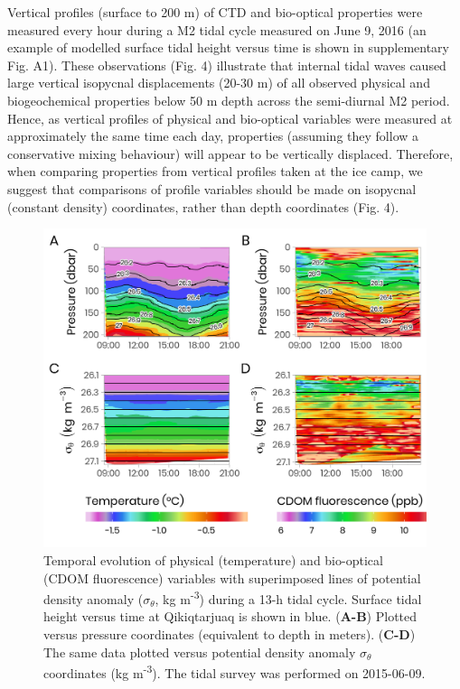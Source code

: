 \documentclass[essd, manuscript]{copernicus}
\begin{document}
Vertical profiles (surface to 200 m) of CTD and bio-optical properties were measured every hour during a M2 tidal cycle measured on June 9, 2016 (an example of modelled surface tidal height versus time is shown in supplementary Fig. A1). These observations (Fig. 4) illustrate that internal tidal waves caused large vertical isopycnal displacements (20-30 m) of all observed physical and biogeochemical properties below 50 m depth across the semi-diurnal M2 period. Hence, as vertical profiles of physical and bio-optical variables were measured at approximately the same time each day, properties (assuming they follow a conservative mixing behaviour) will appear to be vertically displaced. Therefore, when comparing properties from vertical profiles taken at the ice camp, we suggest that comparisons of profile variables should be made on isopycnal (constant density) coordinates, rather than depth coordinates (Fig. 4).

\begin{figure}[H]
	\centering
	\includegraphics[scale = 1]{../../../graphs/fig04.png}
	\caption{Temporal evolution of physical (temperature) and bio-optical (CDOM fluorescence) variables with superimposed lines of potential density anomaly ($\sigma_\theta$, kg m\textsuperscript{-3}) during a 13-h tidal cycle. Surface tidal height versus time at Qikiqtarjuaq is shown in blue. (\textbf{A-B}) Plotted versus pressure coordinates (equivalent to depth in meters). (\textbf{C-D}) The same data plotted versus potential density anomaly $\sigma_\theta$ coordinates (kg m\textsuperscript{-3}). The tidal survey was performed on 2015-06-09.}
\end{figure}
\end{document}
